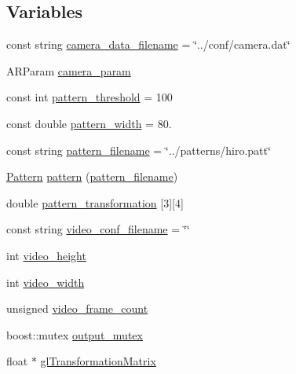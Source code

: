 \subsection*{\-Variables}
\begin{DoxyCompactItemize}
\item 
const string \hyperlink{namespacecg_1_1pi_1_1ar_ada61113604afb0827c60d1ce05d7bc14}{camera\-\_\-data\-\_\-filename} = \char`\"{}../conf/camera.\-dat\char`\"{}
\item 
\-A\-R\-Param \hyperlink{namespacecg_1_1pi_1_1ar_ab8aaea8a88d522dba301bbda1b2e83e8}{camera\-\_\-param}
\item 
const int \hyperlink{namespacecg_1_1pi_1_1ar_af24c104be0dcdd7c93225b4a502d2218}{pattern\-\_\-threshold} = 100
\item 
const double \hyperlink{namespacecg_1_1pi_1_1ar_ad69650d92577ded4642d917dfce4e253}{pattern\-\_\-width} = 80.
\item 
const string \hyperlink{namespacecg_1_1pi_1_1ar_ae2c3180f588b76bd373565b747fead03}{pattern\-\_\-filename} = \char`\"{}../patterns/hiro.\-patt\char`\"{}
\item 
\hyperlink{classcg_1_1pi_1_1_pattern}{\-Pattern} \hyperlink{namespacecg_1_1pi_1_1ar_a73773bdd3e1457f2e80a246d51c9c10b}{pattern} (\hyperlink{namespacecg_1_1pi_1_1ar_ae2c3180f588b76bd373565b747fead03}{pattern\-\_\-filename})
\item 
double \hyperlink{namespacecg_1_1pi_1_1ar_a325752bd43485d2fc7977218ff01ca97}{pattern\-\_\-transformation} \mbox{[}3\mbox{]}\mbox{[}4\mbox{]}
\item 
const string \hyperlink{namespacecg_1_1pi_1_1ar_aef204bbaf562a37c596d560a36a397c3}{video\-\_\-conf\-\_\-filename} = \char`\"{}\char`\"{}
\item 
int \hyperlink{namespacecg_1_1pi_1_1ar_a66aed64c189cf8e9d0be11a1ac453843}{video\-\_\-height}
\item 
int \hyperlink{namespacecg_1_1pi_1_1ar_a16114fb5e187c2a5bbaaac162d644df4}{video\-\_\-width}
\item 
unsigned \hyperlink{namespacecg_1_1pi_1_1ar_a1acf4d5fc1ffdfdf7f395457b2b59a75}{video\-\_\-frame\-\_\-count}
\item 
boost\-::mutex \hyperlink{namespacecg_1_1pi_1_1ar_af9c0ea4eefb7149284522e73acd06221}{output\-\_\-mutex}
\item 
float $\ast$ \hyperlink{namespacecg_1_1pi_1_1ar_a3d6b78e9280aef07edbb62c471582713}{gl\-Transformation\-Matrix}
\end{DoxyCompactItemize}


